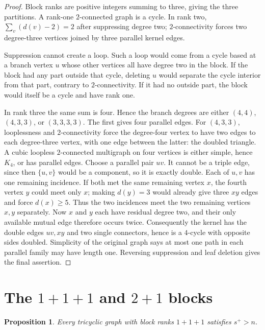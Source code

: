 \documentclass[11pt]{article}
\newtheorem{proposition}[theorem]{Proposition}
\theoremstyle{remark}
\newcommand{\splus}{s^+}
\begin{document}
\begin{proof}
Block ranks are positive integers summing to three, giving the three
partitions.  A rank-one $2$-connected graph is a cycle.  In rank two,
$\sum_v(d(v)-2)=2$ after suppressing degree two; $2$-connectivity forces two
degree-three vertices joined by three parallel kernel edges.

Suppression cannot create a loop. Such a loop would come from a cycle based at
a branch vertex $u$ whose other vertices all have degree two in the block. If
the block had any part outside that cycle, deleting $u$ would separate the
cycle interior from that part, contrary to $2$-connectivity. If it had no
outside part, the block would itself be a cycle and have rank one.

In rank three the same sum is four.  Hence the branch degrees are either
$(4,4)$, $(4,3,3)$, or $(3,3,3,3)$.  The first gives four parallel edges.
For $(4,3,3)$, looplessness and $2$-connectivity force the degree-four vertex
to have two edges to each degree-three vertex, with one edge between the latter:
 the doubled triangle.  A cubic loopless $2$-connected multigraph on four
vertices is either simple, hence $K_4$, or has parallel edges.  Choose a
parallel pair $uv$.  It cannot be a triple edge, since then $\{u,v\}$ would
be a component, so it is exactly double.  Each of $u,v$ has one remaining
incidence.  If both met the same remaining vertex $x$, the fourth vertex $y$
could meet only $x$; making $d(y)=3$ would already give three $xy$ edges and
force $d(x)\geq5$.  Thus the two incidences meet the two remaining vertices
$x,y$ separately.  Now $x$ and $y$ each have residual degree two, and their
only available mutual edge therefore occurs twice.  Consequently the kernel
has the double edges $uv,xy$ and two single connectors, hence is a $4$-cycle
with opposite sides doubled.  Simplicity of the original graph says at most
one path in each parallel family may have length one.  Reversing suppression
and leaf deletion gives the final assertion.
\end{proof}

\section{The $1+1+1$ and $2+1$ blocks}

\begin{proposition}\label{prop:111}
Every tricyclic graph with block ranks $1+1+1$ satisfies $\splus>n$.
\end{proposition}
\end{document}
